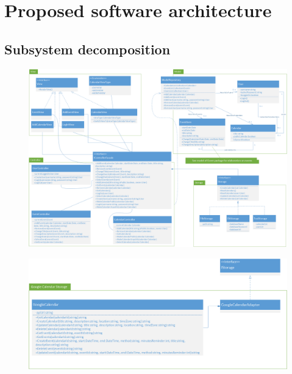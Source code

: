 \documentclass[10pt]{report}
\numberwithin{equation}{section} %
\numberwithin{figure}{section} %
\numberwithin{table}{section} %
\begin{document}
\section{Proposed software architecture}

\subsection{Subsystem decomposition}
\begin{figure}[H]
  \includegraphics[scale=0.40]{figures/classdiagram.png}
\end{figure}

\begin{figure}[H]
  \includegraphics[scale=0.6]{figures/google_adapter.png}
\end{figure}
\end{document}
